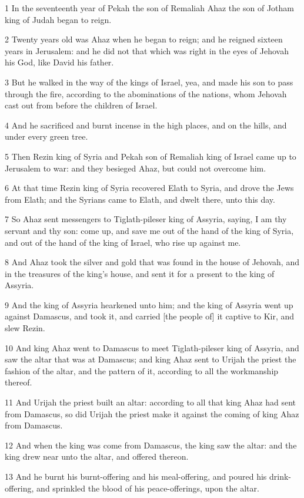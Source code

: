 \par 1 In the seventeenth year of Pekah the son of Remaliah Ahaz the son of Jotham king of Judah began to reign.
\par 2 Twenty years old was Ahaz when he began to reign; and he reigned sixteen years in Jerusalem: and he did not that which was right in the eyes of Jehovah his God, like David his father.
\par 3 But he walked in the way of the kings of Israel, yea, and made his son to pass through the fire, according to the abominations of the nations, whom Jehovah cast out from before the children of Israel.
\par 4 And he sacrificed and burnt incense in the high places, and on the hills, and under every green tree.
\par 5 Then Rezin king of Syria and Pekah son of Remaliah king of Israel came up to Jerusalem to war: and they besieged Ahaz, but could not overcome him.
\par 6 At that time Rezin king of Syria recovered Elath to Syria, and drove the Jews from Elath; and the Syrians came to Elath, and dwelt there, unto this day.
\par 7 So Ahaz sent messengers to Tiglath-pileser king of Assyria, saying, I am thy servant and thy son: come up, and save me out of the hand of the king of Syria, and out of the hand of the king of Israel, who rise up against me.
\par 8 And Ahaz took the silver and gold that was found in the house of Jehovah, and in the treasures of the king's house, and sent it for a present to the king of Assyria.
\par 9 And the king of Assyria hearkened unto him; and the king of Assyria went up against Damascus, and took it, and carried [the people of] it captive to Kir, and slew Rezin.
\par 10 And king Ahaz went to Damascus to meet Tiglath-pileser king of Assyria, and saw the altar that was at Damascus; and king Ahaz sent to Urijah the priest the fashion of the altar, and the pattern of it, according to all the workmanship thereof.
\par 11 And Urijah the priest built an altar: according to all that king Ahaz had sent from Damascus, so did Urijah the priest make it against the coming of king Ahaz from Damascus.
\par 12 And when the king was come from Damascus, the king saw the altar: and the king drew near unto the altar, and offered thereon.
\par 13 And he burnt his burnt-offering and his meal-offering, and poured his drink-offering, and sprinkled the blood of his peace-offerings, upon the altar.
